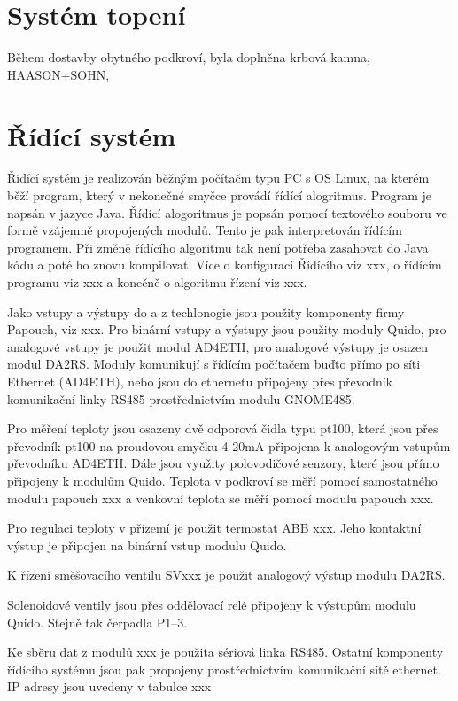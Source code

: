 \documentclass[a4paper,draft]{book}
\begin{document}
\chapter{Systém topení}\label{chap:heating}

    Během dostavby obytného podkroví, byla doplněna krbová kamna, HAASON+SOHN,


\chapter{Řídící systém}\label{chap:control}

    Řídící systém je realizován běžným počítačm typu PC s OS Linux, na kterém
    běží program, který v nekonečné smyčce provádí řídící alogritmus. Program
    je napsán v jazyce Java. Řídící alogoritmus je popsán pomocí textového
    souboru ve formě vzájemně propojených modulů. Tento je pak interpretován
    řídícím programem. Při změně řídícího algoritmu tak není potřeba zasahovat
    do Java kódu a poté ho znovu kompilovat. Více o konfiguraci Řídícího
    viz xxx, o řídícím programu viz xxx a konečně o algoritmu řízení viz xxx.

    Jako vstupy a výstupy do a z techlonogie jsou použity komponenty firmy
    Papouch, viz xxx. Pro binární vstupy a výstupy jsou použity moduly Quido,
    pro analogové vstupy je použit modul AD4ETH, pro analogové výstupy je
    osazen modul DA2RS. Moduly komunikují s řídícím počítačem buďto přímo
    po síti Ethernet (AD4ETH), nebo jsou do ethernetu připojeny přes převodník
    komunikační linky RS485 prostřednictvím modulu GNOME485.

    Pro měření teploty jsou osazeny dvě odporová čidla typu pt100, která jsou
    přes převodník pt100 na proudovou smyčku 4-20mA připojena k analogovým
    vstupům převodníku AD4ETH. Dále jsou využity polovodičové senzory, které
    jsou přímo připojeny k modulům Quido. Teplota v podkroví se měří pomocí
    samostatného modulu papouch xxx a venkovní teplota se měří pomocí modulu
    papouch xxx.

    Pro regulaci teploty v přízemí je použit termostat ABB xxx. Jeho kontaktní
    výstup je připojen na binární vstup modulu Quido.

    K řízení směšovacího ventilu SVxxx je použit analogový výstup modulu DA2RS.

    Solenoidové ventily jsou přes oddělovací relé připojeny k výstupům modulu
    Quido. Stejně tak čerpadla P1--3.

    Ke sběru dat z modulů xxx je použita sériová linka RS485. Ostatní komponenty
    řídícího systému jsou pak propojeny prostřednictvím komunikační sítě
    ethernet. IP adresy jsou uvedeny v tabulce xxx
\end{document}

